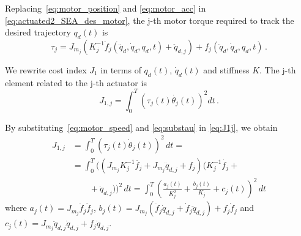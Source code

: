 Replacing~\eqref{eq:motor_position} and \eqref{eq:motor_acc} in \eqref{eq:actuated2_SEA_des_motor}, the j-{th} motor torque required to track the desired trajectory $q_d(t)$ is
\begin{equation}
\tau_j = J_{m_j}(K_j^{-1} \ddot{f}_j(\ddot{q}_d, \dot{q}_d, q_d, t) + \ddot{q}_{d,j}) + f_j(\ddot{q}_d, \dot{q}_d, q_d, t) \,.
\label{eq:substau}
\end{equation}

We rewrite cost index $J_1$ in terms of $q_d(t)$, $\dot q_d(t)$ and stiffness $K$. The j-th element related to the j-th actuator is
\begin{equation}
J_{1,j}=\int_0^T{(\tau_{j}(t)\dot{\theta_{j}}(t))^{2}dt}\, .
\label{eq:J1j}
\end{equation}

By substituting~\eqref{eq:motor_speed} and \eqref{eq:substau} in \eqref{eq:J1j}, we obtain
\begin{align*}
J_{1,j}&=\int_0^T(\tau_{j}(t)\dot{\theta}_{j}(t))^2\,dt = \nonumber\\
&= \int_0^T((J_{m_j}K_{j}^{-1} \ddot{f_{j}}+ J_{m_j}\ddot{q}_{d,j}+f_{j})(K_{j}^{-1} \dot{f_{j}} +\nonumber\\ 
&\qquad+\dot{q}_{d,j}))^2\,dt= \int_0^T\left(\frac{a_{j}(t)}{K_{j}^{2}} + \frac{b_{j}(t)}{K_{j}}+ c_{j}(t)\right)^{2}\,dt
\end{align*}
where $a_{j}(t) = J_{m_j} \ddot{f}_{j} \dot{f}_{j}$, $b_{j}(t) = J_{m_j} (\ddot{f}_{j} \dot{q}_{d,j} +\dot f_j \ddot q_{d,j}) + f_{j}\dot{f}_{j}$ and
$c_{j}(t) = J_{m_j} \ddot{q}_{d,j} \dot{q}_{d,j} + f_{j}\dot{q}_{d,j}$. %
% 
% 

